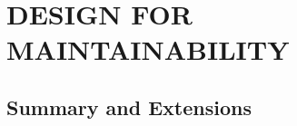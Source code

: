 \chapter{DESIGN FOR MAINTAINABILITY}\label{chap:17}


\section{Summary and Extensions}


\begin{exercises}
    \begin{exercise}
    \label{}
    
    \end{exercise}
    \begin{solution}
    \end{solution}

\end{exercises}